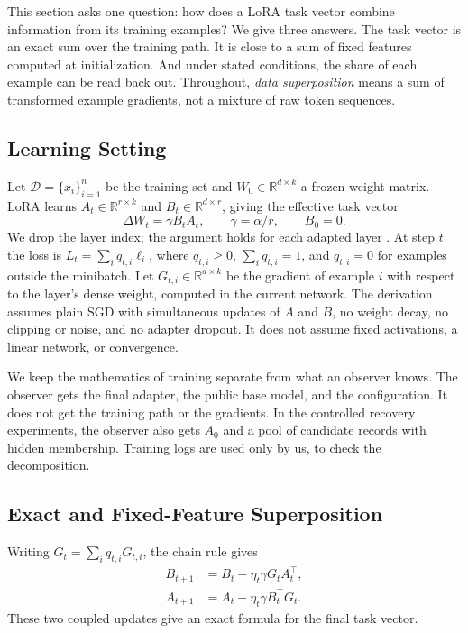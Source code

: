 \documentclass[11pt]{article}
\theoremstyle{plain}
\theoremstyle{definition}
\begin{document}
This section asks one question: how does a LoRA task vector combine information from its training examples?
We give three answers.
The task vector is an exact sum over the training path.
It is close to a sum of fixed features computed at initialization.
And under stated conditions, the share of each example can be read back out.
Throughout, \emph{data superposition} means a sum of transformed example gradients, not a mixture of raw token sequences.

\subsection{Learning Setting}
\label{sec:superposition_setting}

Let $\mathcal D=\{x_i\}_{i=1}^n$ be the training set and $W_0\in\mathbb R^{d\times k}$ a frozen weight matrix.
LoRA learns $A_t\in\mathbb R^{r\times k}$ and $B_t\in\mathbb R^{d\times r}$, giving the effective task vector
\begin{equation}
\Delta W_t=\gamma B_tA_t,\qquad \gamma=\alpha/r,\qquad B_0=0.
\label{eq:effective_task_vector}
\end{equation}
We drop the layer index; the argument holds for each adapted layer \citep{hu2022lora}.
At step $t$ the loss is $L_t=\sum_iq_{t,i}\ell_i$, where $q_{t,i}\geq0$, $\sum_iq_{t,i}=1$, and $q_{t,i}=0$ for examples outside the minibatch.
Let $G_{t,i}\in\mathbb R^{d\times k}$ be the gradient of example $i$ with respect to the layer's dense weight, computed in the current network.
The derivation assumes plain SGD with simultaneous updates of $A$ and $B$, no weight decay, no clipping or noise, and no adapter dropout.
It does not assume fixed activations, a linear network, or convergence.

We keep the mathematics of training separate from what an observer knows.
The observer gets the final adapter, the public base model, and the configuration. It does not get the training path or the gradients.
In the controlled recovery experiments, the observer also gets $A_0$ and a pool of candidate records with hidden membership.
Training logs are used only by us, to check the decomposition.

\subsection{Exact and Fixed-Feature Superposition}
\label{sec:exact_superposition}

Writing $G_t=\sum_iq_{t,i}G_{t,i}$, the chain rule gives
\begin{equation}
\begin{aligned}
B_{t+1}&=B_t-\eta_t\gamma G_tA_t^\top,\\
A_{t+1}&=A_t-\eta_t\gamma B_t^\top G_t.
\end{aligned}
\label{eq:factor_dynamics}
\end{equation}
These two coupled updates give an exact formula for the final task vector.
\end{document}
